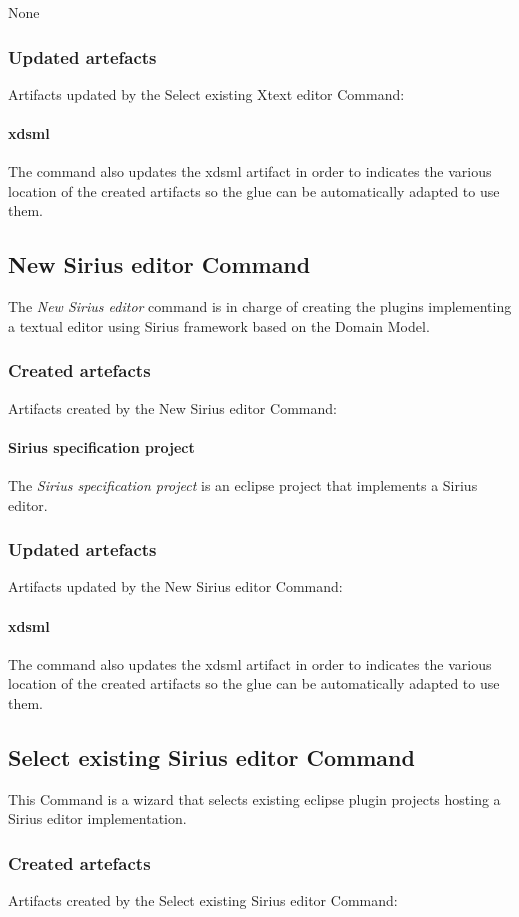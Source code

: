 \documentclass{gemoc} %
\begin{document}
	None
\subsubsection{Updated artefacts}
Artifacts updated by the Select existing Xtext editor Command:
\paragraph{xdsml} 
The command also updates the xdsml artifact in order to indicates the various location of the created artifacts so the glue can be automatically adapted to use them.

\subsection{New Sirius editor Command}
The \emph{New Sirius editor} command is in charge of creating the plugins implementing a textual editor using Sirius framework based on the Domain Model.
\subsubsection{Created artefacts}
Artifacts created by the New Sirius editor Command:
\paragraph{Sirius specification project} 
The \emph{Sirius specification project} is an eclipse project that implements a Sirius editor.
\subsubsection{Updated artefacts}
Artifacts updated by the New Sirius editor Command:
\paragraph{xdsml} 
The command also updates the xdsml artifact in order to indicates the various location of the created artifacts so the glue can be automatically adapted to use them.

\subsection{Select existing Sirius editor Command}
This Command is a wizard that selects existing eclipse plugin projects hosting a Sirius editor implementation.
\subsubsection{Created artefacts}
Artifacts created by the Select existing Sirius editor Command:
\end{document}
